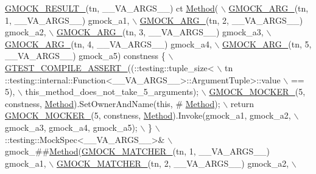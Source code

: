\begin{DoxyCode}
\hyperlink{gmock-generated-function-mockers_8h_a0e9d94e9c77df84f1103af06feee1077}{GMOCK\_RESULT\_}(tn, \_\_VA\_ARGS\_\_) ct \hyperlink{gmock-spec-builders__test_8cc_a95606368148f3e5aab5db46c32466afd}{Method}( \(\backslash\)
      \hyperlink{gmock-generated-function-mockers_8h_a887575cc1c31158fba808180a10c004f}{GMOCK\_ARG\_}(tn, 1, \_\_VA\_ARGS\_\_) gmock\_a1, \(\backslash\)
      \hyperlink{gmock-generated-function-mockers_8h_a887575cc1c31158fba808180a10c004f}{GMOCK\_ARG\_}(tn, 2, \_\_VA\_ARGS\_\_) gmock\_a2, \(\backslash\)
      \hyperlink{gmock-generated-function-mockers_8h_a887575cc1c31158fba808180a10c004f}{GMOCK\_ARG\_}(tn, 3, \_\_VA\_ARGS\_\_) gmock\_a3, \(\backslash\)
      \hyperlink{gmock-generated-function-mockers_8h_a887575cc1c31158fba808180a10c004f}{GMOCK\_ARG\_}(tn, 4, \_\_VA\_ARGS\_\_) gmock\_a4, \(\backslash\)
      \hyperlink{gmock-generated-function-mockers_8h_a887575cc1c31158fba808180a10c004f}{GMOCK\_ARG\_}(tn, 5, \_\_VA\_ARGS\_\_) gmock\_a5) constness \{ \hyperlink{gtest-port_8h_ae1f37dc71d5daa6fb49ca1b6047d4a8c}{\(\backslash\)}
\hyperlink{gtest-port_8h_ae1f37dc71d5daa6fb49ca1b6047d4a8c}{    GTEST\_COMPILE\_ASSERT\_}((::testing::tuple\_size<                          \(\backslash\)
        tn ::testing::internal::Function<\_\_VA\_ARGS\_\_>::ArgumentTuple>::value \(\backslash\)
            == 5), \(\backslash\)
        this\_method\_does\_not\_take\_5\_arguments); \hyperlink{gmock-generated-function-mockers_8h_a7d362499e27b1bc3a9806dd3cf58a5b7}{\(\backslash\)}
\hyperlink{gmock-generated-function-mockers_8h_a7d362499e27b1bc3a9806dd3cf58a5b7}{    GMOCK\_MOCKER\_}(5, constness, \hyperlink{gmock-spec-builders__test_8cc_a95606368148f3e5aab5db46c32466afd}{Method}).SetOwnerAndName(\textcolor{keyword}{this}, #
      \hyperlink{gmock-spec-builders__test_8cc_a95606368148f3e5aab5db46c32466afd}{Method}); \(\backslash\)
    return \hyperlink{gmock-generated-function-mockers_8h_a7d362499e27b1bc3a9806dd3cf58a5b7}{GMOCK\_MOCKER\_}(5, constness, \hyperlink{gmock-spec-builders__test_8cc_a95606368148f3e5aab5db46c32466afd}{Method}).Invoke(gmock\_a1, gmock\_a2, \(\backslash\)
        gmock\_a3, gmock\_a4, gmock\_a5); \(\backslash\)
  \} \(\backslash\)
  ::testing::MockSpec<\_\_VA\_ARGS\_\_>& \(\backslash\)
      gmock\_##\hyperlink{gmock-spec-builders__test_8cc_a95606368148f3e5aab5db46c32466afd}{Method}(\hyperlink{gmock-generated-function-mockers_8h_aa87d0009fe91f1c89d658776b55a769c}{GMOCK\_MATCHER\_}(tn, 1, \_\_VA\_ARGS\_\_) gmock\_a1, \(\backslash\)
                     \hyperlink{gmock-generated-function-mockers_8h_aa87d0009fe91f1c89d658776b55a769c}{GMOCK\_MATCHER\_}(tn, 2, \_\_VA\_ARGS\_\_) gmock\_a2, \(\backslash\)

\end{DoxyCode}
